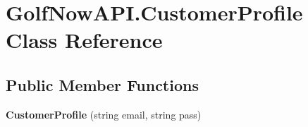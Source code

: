 \hypertarget{class_golf_now_a_p_i_1_1_customer_profile}{}\section{Golf\+Now\+A\+P\+I.\+Customer\+Profile Class Reference}
\label{class_golf_now_a_p_i_1_1_customer_profile}
\subsection*{Public Member Functions}
\begin{DoxyCompactItemize}
\item 
\mbox{\label{class_golf_now_a_p_i_1_1_customer_profile_aeef7f9c75234d4182b3ad0ee0049aac2}} 
{\bfseries Customer\+Profile} (string email, string pass)
\end{DoxyCompactItemize}
